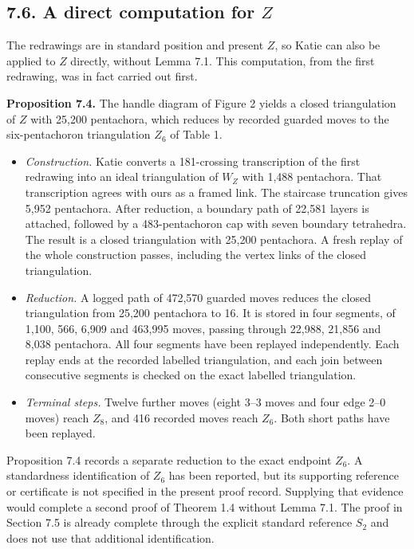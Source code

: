\documentclass[11pt,letterpaper]{article}
\begin{document}
\subsection*{7.6. A direct computation for $Z$}
The redrawings are in standard position and present $Z$, so Katie can also be applied to $Z$ directly, without Lemma 7.1. This computation, from the first redrawing, was in fact carried out first.

\medskip\noindent\textbf{Proposition 7.4.} The handle diagram of Figure 2 yields a closed triangulation of $Z$ with 25,200 pentachora, which reduces by recorded guarded moves to the six-pentachoron triangulation $Z_6$ of Table 1.
\begin{itemize}
\item \emph{Construction.} Katie converts a 181-crossing transcription of the first redrawing into an ideal triangulation of $W_Z$ with 1,488 pentachora. That transcription agrees with ours as a framed link. The staircase truncation gives 5,952 pentachora. After reduction, a boundary path of 22,581 layers is attached, followed by a 483-pentachoron cap with seven boundary tetrahedra. The result is a closed triangulation with 25,200 pentachora. A fresh replay of the whole construction passes, including the vertex links of the closed triangulation.
\item \emph{Reduction.} A logged path of 472,570 guarded moves reduces the closed triangulation from 25,200 pentachora to 16. It is stored in four segments, of 1,100, 566, 6,909 and 463,995 moves, passing through 22,988, 21,856 and 8,038 pentachora. All four segments have been replayed independently. Each replay ends at the recorded labelled triangulation, and each join between consecutive segments is checked on the exact labelled triangulation.
\item \emph{Terminal steps.} Twelve further moves (eight 3--3 moves and four edge 2--0 moves) reach $Z_8$, and 416 recorded moves reach $Z_6$. Both short paths have been replayed.
\end{itemize}
Proposition 7.4 records a separate reduction to the exact endpoint $Z_6$. A standardness identification of $Z_6$ has been reported, but its supporting reference or certificate is not specified in the present proof record. Supplying that evidence would complete a second proof of Theorem 1.4 without Lemma 7.1. The proof in Section 7.5 is already complete through the explicit standard reference $S_2$ and does not use that additional identification.
\end{document}
